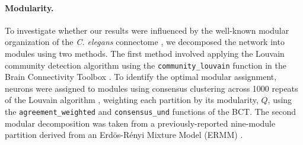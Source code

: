 \documentclass[10pt,letterpaper]{article}
\begin{document}
\paragraph{Modularity.}
To investigate whether our results were influenced by the well-known modular organization of the \emph{C. elegans} connectome \cite{Kim:2014bu, Pan:2010jt, Bassett2010, Achacoso:1992ay, Pavlovic:2014gx}, we decomposed the network into modules using two methods.
The first method involved applying the Louvain community detection algorithm \cite{Blondel:2008do} using the \texttt{community\_louvain} function in the Brain Connectivity Toolbox \cite{Rubinov:2010jd}.
To identify the optimal modular assignment, neurons were assigned to modules using consensus clustering across 1000 repeats of the Louvain algorithm \cite{Lancichinetti2012}, weighting each partition by its modularity, $Q$, using the \texttt{agreement\_weighted} and \texttt{consensus\_und} functions of the BCT\cite{Rubinov:2010jd}.
The second modular decomposition was taken from a previously-reported nine-module partition derived from an Erd\"os-R\'enyi Mixture Model (ERMM) \cite{Pavlovic:2014gx}.


\end{document}
